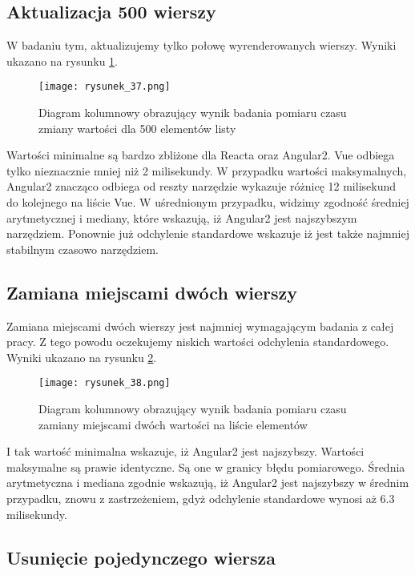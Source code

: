 \subsection{Aktualizacja 500 wierszy}
W badaniu tym, aktualizujemy tylko połowę wyrenderowanych wierszy. Wyniki ukazano na rysunku \ref{fig:rysunek_37}.
\begin{figure}[!ht]
    \centering
    \texttt{[image: rysunek\_37.png]}
    \caption{Diagram kolumnowy obrazujący wynik badania pomiaru czasu zmiany wartości dla 500 elementów listy}
    \label{fig:rysunek_37}
\end{figure}
Wartości minimalne są bardzo zbliżone dla Reacta oraz Angular2. Vue odbiega tylko nieznacznie mniej niż 2 milisekundy.
W przypadku wartości maksymalnych, Angular2 znacząco odbiega od reszty narzędzie wykazuje różnicę 12 milisekund do kolejnego na liście Vue.
W uśrednionym przypadku, widzimy zgodność średniej arytmetycznej i mediany, które wskazują, iż Angular2 jest najszybszym narzędziem.
Ponownie już odchylenie standardowe wskazuje iż jest także najmniej stabilnym czasowo narzędziem.


\subsection{Zamiana miejscami dwóch wierszy}

Zamiana miejscami dwóch wierszy jest najmniej wymagającym badania z całej pracy. Z tego powodu oczekujemy niskich wartości odchylenia standardowego. Wyniki ukazano na rysunku \ref{fig:rysunek_38}.

\begin{figure}[!ht]
    \centering
    \texttt{[image: rysunek\_38.png]}
    \caption{Diagram kolumnowy obrazujący wynik badania pomiaru czasu zamiany miejscami dwóch wartości na liście elementów}
    \label{fig:rysunek_38}
\end{figure}

I tak wartość minimalna wskazuje, iż Angular2 jest najszybszy. Wartości maksymalne są prawie identyczne.
Są one w granicy błędu pomiarowego. Średnia arytmetyczna i mediana zgodnie wskazują, iż Angular2 jest najszybszy w średnim przypadku, znowu z zastrzeżeniem, gdyż odchylenie standardowe wynosi aż 6.3 milisekundy.

\subsection{Usunięcie pojedynczego wiersza}

